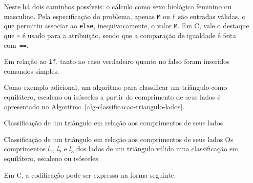 \documentclass[
  11pt,
  a4paper,
]{scrbook}
\begin{document}
Neste há dois caminhos possíveis: o cálculo como sexo biológico feminino
ou masculino. Pela especificação do problema, apenas \texttt{M} ou
\texttt{F} são entradas válidas, o que permitiu associar ao
\texttt{else}, inequivocamente, o valor \texttt{M}. Em C, vale o
destaque que \texttt{=} é usado para a atribuição, sendo que a
comparação de igualdade é feita com~\texttt{==}.

Em relação ao \texttt{if}, tanto no caso verdadeiro quanto no falso
foram inseridos comandos simples.

Como exemplo adicional, um algoritmo para classificar um triângulo como
equilátero, escaleno ou isósceles a partir do comprimento de seus lados
é apresentado no Algoritmo~\ref{alg-classificacao-triangulo-lados}.

\begin{algorithm}
\caption{\label{alg-classificacao-triangulo-lados}Classificação de um
triângulo em relação aos comprimentos de seus lados}
\begingroup%


\begin{algorithmic}
    \Description Classificação de um triângulo em relação aos comprimentos de seus lados
    \Require Os comprimentos $l_1$, $l_2$ e $l_3$ dos lados de um triângulo válido
    \Ensure uma classificação em equilátero, escaleno ou isósceles
    \Statex{}
    \Else
    \EndIf
\end{algorithmic}

\endgroup
\end{algorithm}

Em C, a codificação pode ser expressa na forma seguinte.
\end{document}
